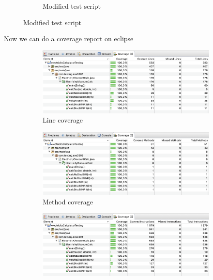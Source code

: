 \documentclass{article}
\begin{document}
\begin{figure}[h!]
\begin{subfigure}[b]{0.3\linewidth}
			\caption{Modified test script}
        \end{subfigure}
		\label{fig:coveragereportinstance}
    \end{figure}

    \bigskip

    Now we can do a coverage report on eclipse

    \begin{figure}[h!]
		\centering
		\begin{subfigure}[b]{0.4\linewidth}
			\includegraphics[width=\linewidth]{coverage/opti/line_coverage.png}
			\caption{Line coverage}
		\end{subfigure}
		\begin{subfigure}[b]{0.4\linewidth}
			\includegraphics[width=\linewidth]{coverage/opti/method_coverage.png}
			\caption{Method coverage}
        \end{subfigure}
        \begin{subfigure}[b]{0.4\linewidth}
			\includegraphics[width=\linewidth]{coverage/opti/instruction_coverage.png}

\end{subfigure}
\end{figure}
\end{document}

